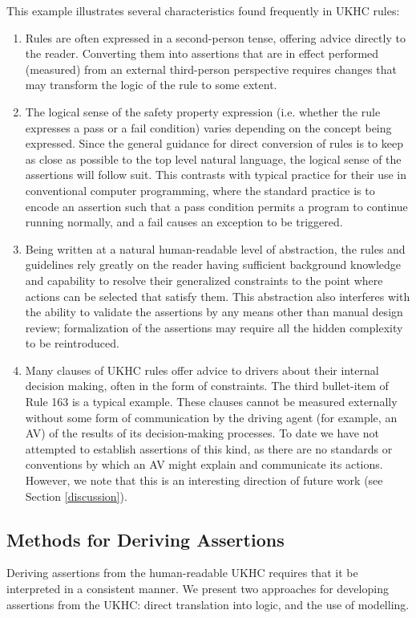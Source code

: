 This example illustrates several characteristics found frequently in UKHC rules: %
\begin{enumerate}[i, labelindent=0pt]
\item Rules are often expressed in a second-person tense, offering advice directly to the reader. Converting them into assertions that are in effect performed (measured) from an external third-person perspective requires changes that may transform the logic of the rule to some extent. 
\item The logical sense of the safety property expression (i.e. whether the rule expresses a pass or a fail condition) varies depending on the concept being expressed. Since the general guidance for direct conversion of rules is to keep as close as possible to the top level natural language, the logical sense of the assertions will follow suit. This contrasts with typical practice for their use in conventional computer programming, where the standard practice is to encode an assertion such that a pass condition permits a program to continue running normally, and a fail causes an exception to be triggered.
\item Being written at a natural human-readable level of abstraction, the rules and guidelines rely greatly on the reader having sufficient background knowledge and capability to resolve their generalized constraints to the point where actions can be selected that satisfy them. This abstraction also interferes with the ability to validate the assertions by any means other than manual design review; formalization of the assertions may require all the hidden complexity to be reintroduced. 
\item Many clauses of UKHC rules offer advice to drivers about their internal decision making, often in the form of constraints. The third bullet-item of Rule 163 is a typical example. These clauses cannot be measured externally without some form of communication by the driving agent (for example, an AV) of the results of its decision-making processes. To date we have not attempted to establish assertions of this kind, as there are no standards or conventions by which an AV might explain and communicate its actions. However, we note that this is an interesting direction of future work (see Section \ref{discussion}). 
\end{enumerate}




\subsection{Methods for Deriving Assertions}\label{deriving_assertions}
Deriving assertions from the human-readable UKHC %
requires that it be interpreted in a consistent manner. 
We present two approaches %
for developing assertions from the UKHC: direct translation into logic, and the use of modelling.

